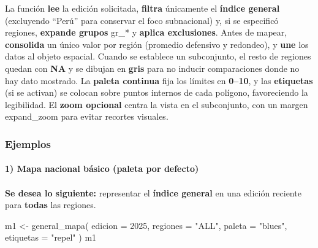 \documentclass[
  11pt,
  letterpaper,
  DIV=11,
  numbers=noendperiod]{scrartcl}
\makeatletter
\let\oldparagraph\paragraph
\renewcommand{\paragraph}{
    \@ifstar
      \xxxParagraphStar
      \xxxParagraphNoStar
  }
\newcommand{\xxxParagraphStar}[1]{\oldparagraph*{#1}\mbox{}}
\newcommand{\xxxParagraphNoStar}[1]{\oldparagraph{#1}\mbox{}}
\newenvironment{Shaded}{\begin{snugshade}}{\end{snugshade}}
\newcommand{\AttributeTok}[1]{\textcolor[rgb]{0.40,0.45,0.13}{#1}}
\newcommand{\DecValTok}[1]{\textcolor[rgb]{0.68,0.00,0.00}{#1}}
\newcommand{\FunctionTok}[1]{\textcolor[rgb]{0.28,0.35,0.67}{#1}}
\newcommand{\NormalTok}[1]{\textcolor[rgb]{0.00,0.23,0.31}{#1}}
\newcommand{\OtherTok}[1]{\textcolor[rgb]{0.00,0.23,0.31}{#1}}
\newcommand{\StringTok}[1]{\textcolor[rgb]{0.13,0.47,0.30}{#1}}
\makeatother
\begin{document}
La función \textbf{lee} la edición solicitada, \textbf{filtra}
únicamente el \textbf{índice general} (excluyendo ``Perú'' para
conservar el foco subnacional) y, si se especificó regiones,
\textbf{expande grupos} gr\_* y \textbf{aplica exclusiones}. Antes de
mapear, \textbf{consolida} un único valor por región (promedio defensivo
y redondeo), y \textbf{une} los datos al objeto espacial. Cuando se
establece un subconjunto, el resto de regiones quedan con \textbf{NA} y
se dibujan en \textbf{gris} para no inducir comparaciones donde no hay
dato mostrado. La \textbf{paleta continua} fija los límites en
\textbf{0--10}, y las \textbf{etiquetas} (si se activan) se colocan
sobre puntos internos de cada polígono, favoreciendo la legibilidad. El
\textbf{zoom opcional} centra la vista en el subconjunto, con un margen
expand\_zoom para evitar recortes visuales.

\subsubsection{\texorpdfstring{\textbf{Ejemplos}}{Ejemplos}}\label{ejemplos-6}

\paragraph{\texorpdfstring{\textbf{1) Mapa nacional básico (paleta por
defecto)}}{1) Mapa nacional básico (paleta por defecto)}}\label{mapa-nacional-buxe1sico-paleta-por-defecto}

\paragraph{\texorpdfstring{\textbf{Se desea lo siguiente:} representar
el \textbf{índice general} en una edición reciente para \textbf{todas}
las
regiones.}{Se desea lo siguiente: representar el índice general en una edición reciente para todas las regiones.}}\label{se-desea-lo-siguiente-representar-el-uxedndice-general-en-una-ediciuxf3n-reciente-para-todas-las-regiones.}

\begin{Shaded}
\begin{Highlighting}[]
\NormalTok{m1 }\OtherTok{\textless{}{-}} \FunctionTok{general\_mapa}\NormalTok{(}
  \AttributeTok{edicion  =} \DecValTok{2025}\NormalTok{,}
  \AttributeTok{regiones =} \StringTok{"ALL"}\NormalTok{,}
  \AttributeTok{paleta   =} \StringTok{"blues"}\NormalTok{,}
  \AttributeTok{etiquetas =} \StringTok{"repel"}
\NormalTok{)}
\NormalTok{m1}
\end{Highlighting}
\end{Shaded}
\end{document}

